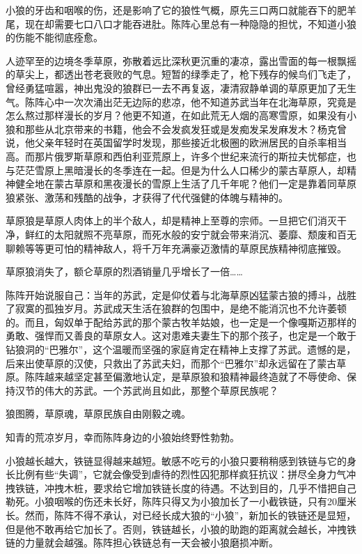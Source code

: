 \par 小狼的牙齿和咽喉的伤，还是影响了它的狼性气概，原先三口两口就能吞下的肥羊尾，现在却需要七口八口才能吞进肚。陈阵心里总有一种隐隐的担忧，不知道小狼的伤能不能彻底痊愈。
\par 人迹罕至的边境冬季草原，弥散着远比深秋更沉重的凄凉，露出雪面的每一根飘摇的草尖上，都透出苍老衰败的气息。短暂的绿季走了，枪下残存的候鸟们飞走了，曾经勇猛喧嚣，神出鬼没的狼群已一去不再复返，凄清寂静单调的草原更加了无生气。陈阵心中一次次涌出茫无边际的悲凉，他不知道苏武当年在北海草原，究竟是怎么熬过那样漫长的岁月？他更不知道，在如此荒无人烟的高寒雪原，如果没有小狼和那些从北京带来的书籍，他会不会发疯发狂或是发痴发呆发麻发木？杨克曾说，他父亲年轻时在英国留学时发现，那些接近北极圈的欧洲居民的自杀率相当高。而那片俄罗斯草原和西伯利亚荒原上，许多个世纪来流行的斯拉夫忧郁症，也与茫茫雪原上黑暗漫长的冬季连在一起。但是为什么人口稀少的蒙古草原人，却精神健全地在蒙古草原和黑夜漫长的雪原上生活了几千年呢？他们一定是靠着同草原狼紧张、激荡和残酷的战争，才获得了代代强健的体魄与精神的。
\par 草原狼是草原人肉体上的半个敌人，却是精神上至尊的宗师。一旦把它们消灭干净，鲜红的太阳就照不亮草原，而死水般的安宁就会带来消沉、萎靡、颓废和百无聊赖等等更可怕的精神敌人，将千万年充满豪迈激情的草原民族精神彻底摧毁。
\par 草原狼消失了，额仑草原的烈酒销量几乎增长了一倍……
\par 陈阵开始说服自己：当年的苏武，定是仰仗着与北海草原凶猛蒙古狼的搏斗，战胜了寂寞的孤独岁月。苏武成天生活在狼群的包围中，是绝不能消沉也不允许萎顿的。而且，匈奴单于配给苏武的那个蒙古牧羊姑娘，也一定是一个像嘎斯迈那样的勇敢、强悍而又善良的草原女人。这对患难夫妻生下的那个孩子，也定是一个敢于钻狼洞的“巴雅尔”，这个温暖而坚强的家庭肯定在精神上支撑了苏武。遗憾的是，后来出使草原的汉使，只救出了苏武夫妇，而那个“巴雅尔”却永远留在了蒙古草原。陈阵越来越坚定甚至偏激地认定，是草原狼和狼精神最终造就了不辱使命、保持汉节的伟大的苏武。一个苏武尚且如此，那整个草原民族呢？
\par 狼图腾，草原魂，草原民族自由刚毅之魂。
\par 知青的荒凉岁月，幸而陈阵身边的小狼始终野性勃勃。
\par 小狼越长越大，铁链显得越来越短。敏感不吃亏的小狼只要稍稍感到铁链与它的身长比例有些“失调”，它就会像受到虐待的烈性囚犯那样疯狂抗议：拼尽全身力气冲拽铁链，冲拽木桩，要求给它增加铁链长度的待遇。不达到目的，几乎不惜把自己勒死。小狼咽喉的伤还未长好，陈阵只得又为小狼加长了一小截铁链，只有20厘米长。然而，陈阵不得不承认，对已经长成大狼的“小狼”，新加长的铁链还是显短，但是他不敢再给它加长了。否则，铁链越长，小狼的助跑的距离就会越长，冲拽铁链的力量就会越强。陈阵担心铁链总有一天会被小狼磨损冲断。
